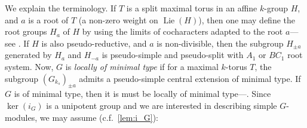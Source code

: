 \documentclass[11pt,reqno]{amsart}
\theoremstyle{definition}
\theoremstyle{remark}
\theoremstyle{definition}
\theoremstyle{plain}
\DeclareMathOperator{\Lie}{Lie}
\begin{document}
We explain the terminology. If $T$ is a split maximal torus in an affine $k$-group $H$, and $a$ is a root of $T$ (a non-zero weight on $\Lie(H)$), then one may define the root groups $H_a$ of $H$ by using the limits of cocharacters adapted to the root $a$---see \cite[\S2.3]{CGP15}. If $H$ is also pseudo-reductive, and $a$ is non-divisible, then the subgroup $H_{\pm a}$ generated by $H_a$ and $H_{-a}$ is pseudo-simple and pseudo-split with $A_1$ or $BC_1$ root system. Now, $G$ is \emph{locally of minimal type} if for a maximal $k$-torus $T$, the subgroup $(G_{k_s})_{\pm a}$ admits a pseudo-simple central extension of minimal type. If $G$ is of minimal type, then it is must be locally of minimal type---\hspace{1sp}\cite[\S4.3]{CPClass}. Since $\ker(i_G)$ is a unipotent group and we are interested in describing simple $G$-modules, we may assume (c.f.~\cref{lem:i_G}):
\begin{center}\end{center}
\end{document}
